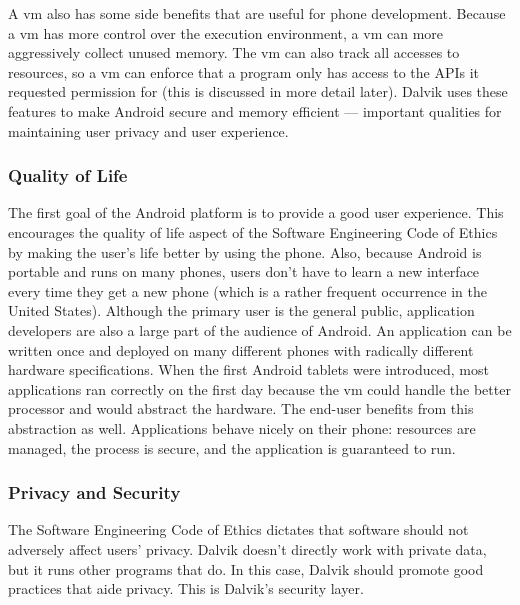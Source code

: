 \documentclass[11pt]{article}
\begin{document}
\begin{multicols}{2}
A \gls{vm} also has some side benefits that are useful for phone development.
Because a \gls{vm} has more control over the execution environment, a \gls{vm}
can more aggressively collect unused memory.  The \gls{vm} can also track all
accesses to resources, so a \gls{vm} can enforce that a program only has access
to the APIs it requested permission for (this is discussed in more detail
later).  Dalvik uses these features to make Android secure and memory efficient
--- important qualities for maintaining user privacy and user experience.


\subsubsection{Quality of Life} %
\label{ssub:quality}

The first goal of the Android platform is to provide a good user experience.
This encourages the quality of life aspect of the Software Engineering Code of
Ethics by making the user's life better by using the phone.  Also, because
Android is portable and runs on many phones, users don't have to learn a new
interface every time they get a new phone (which is a rather frequent occurrence
in the United States).  Although the primary user is the general public,
application developers are also a large part of the audience of Android.  An
application can be written once and deployed on many different phones with
radically different hardware specifications.  When the first Android tablets
were introduced, most applications ran correctly on the first day because the
\gls{vm} could handle the better processor and would abstract the hardware.  The
end-user benefits from this abstraction as well.  Applications behave nicely on
their phone: resources are managed, the process is secure, and the application
is guaranteed to run.


\subsubsection{Privacy and Security} %
\label{ssub:privacy}

The Software Engineering Code of Ethics dictates that software should not
adversely affect users' privacy.  Dalvik doesn't directly work with private
data, but it runs other programs that do.  In this case, Dalvik should promote
good practices that aide privacy.  This is Dalvik's security layer.


\end{multicols}
\end{document}
